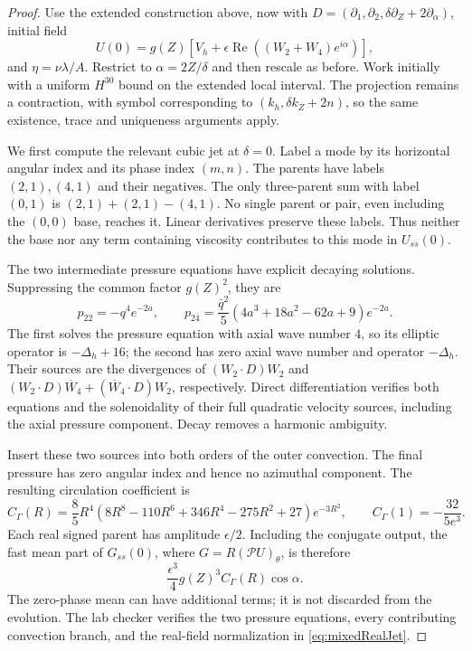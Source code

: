 \documentclass[11pt]{article}
\theoremstyle{remark}
\newcommand{\PP}{\mathcal P}
\begin{document}
\begin{proof}
Use the extended construction above, now with
$D=(\partial_1,\partial_2,\delta\partial_Z+2\partial_\alpha)$,
initial field
\[
 U(0)=g(Z)\left[V_h+\epsilon\operatorname{Re}
                       ((W_2+W_4)e^{i\alpha})\right],
\]
and $\eta=\nu\lambda/A$. Restrict to $\alpha=2Z/\delta$ and
then rescale as before. Work initially with a uniform $H^{30}$ bound
on the extended local interval. The projection remains a contraction,
with symbol corresponding to $(k_h,\delta k_Z+2n)$, so the same
existence, trace and uniqueness arguments apply.

We first compute the relevant cubic jet at $\delta=0$. Label a mode
by its horizontal angular index and its phase index $(m,n)$.
The parents have labels $(2,1),(4,1)$ and their negatives. The only
three-parent sum with label $(0,1)$ is $(2,1)+(2,1)-(4,1)$.
No single parent or pair, even including the $(0,0)$ base, reaches it.
Linear derivatives preserve these labels. Thus neither the base nor
any term containing viscosity contributes to this mode in $U_{ss}(0)$.

The two intermediate pressure equations have explicit decaying
solutions. Suppressing the common factor $g(Z)^2$, they are
\[
 p_{22}=-q^4e^{-2a},\qquad
 p_{2\bar4}=\frac{\bar q^2}{5}
                    (4a^3+18a^2-62a+9)e^{-2a}.
\]
The first solves the pressure equation with axial wave number $4$,
so its elliptic operator is $-\Delta_h+16$; the second has zero
axial wave number and operator $-\Delta_h$. Their sources are the
divergences of $(W_2\cdot D)W_2$ and
$(W_2\cdot D)\overline W_4+(\overline W_4\cdot D)W_2$,
respectively. Direct differentiation verifies both equations and
the solenoidality of their full quadratic velocity sources, including
the axial pressure component. Decay removes a harmonic ambiguity.

Insert these two sources into both orders of the outer convection.
The final pressure has zero angular index and hence no azimuthal
component. The resulting circulation coefficient is
\begin{equation}\label{eq:mixedCubic}
 C_\Gamma(R)=\frac85 R^4
   (8R^8-110R^6+346R^4-275R^2+27)e^{-3R^2},
 \qquad C_\Gamma(1)=-\frac{32}{5e^3}.
\end{equation}
Each real signed parent has amplitude $\epsilon/2$. Including the
conjugate output, the fast mean part of $G_{ss}(0)$, where
$G=R(\PP U)_\theta$, is therefore
\begin{equation}\label{eq:mixedRealJet}
 \frac{\epsilon^3}{4}g(Z)^3 C_\Gamma(R)\cos\alpha.
\end{equation}
The zero-phase mean can have additional terms; it is not discarded
from the evolution. The lab checker verifies the two pressure
equations, every contributing convection branch, and the real-field
normalization in \eqref{eq:mixedRealJet}.


\end{proof}
\end{document}
